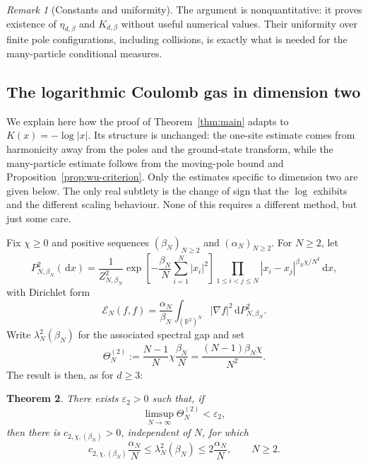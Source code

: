 \documentclass[12pt,reqno,letterpaper]{amsart}
\newtheorem{theorem}{Theorem}[section]
\theoremstyle{definition}
\theoremstyle{remark}
\newtheorem{remark}[theorem]{Remark}
\numberwithin{equation}{section}
\newcommand{\R}{\mathbb R}
\newcommand{\dd}{\,\mathrm d}
\newcommand{\be}{\beta}
\newcommand{\al}{\alpha}
\newcommand{\cE}{\mathcal E}
\begin{document}
\begin{remark}[Constants and uniformity]
The argument is nonquantitative: it proves existence of
\(\eta_{d,\be}\) and \(K_{d,\be}\) without useful numerical values.
Their uniformity over finite pole configurations, including collisions, is
exactly what is needed for the many-particle conditional measures.
\end{remark}

\begin{appendix}
    
\section{The logarithmic Coulomb gas in dimension two}
\label{app:planar-log}

We explain here how the proof of Theorem~\ref{thm:main} adapts to
\(K(x)=-\log|x|\).  Its structure is unchanged: the one-site estimate comes
from harmonicity away from the poles and the ground-state transform, while
the many-particle estimate follows from the moving-pole bound and
Proposition~\ref{prop:wu-criterion}.  Only the estimates specific to dimension
two are given below. The only real subtlety is the change of sign that the $\log$ exhibits and the different scaling behaviour. None of this requires a different method, but just some care.

Fix \(\chi\ge0\) and positive sequences \((\be_N)_{N\ge2}\) and
\((\al_N)_{N\ge2}\).  For \(N\ge2\), let
\begin{equation}\label{eq:planar-law}
 P_{N,\be_N}^{2}(\dd x)
 =\frac1{Z_{N,\be_N}^{2}}
 \exp\!\left[-\frac{\be_N}{N}\sum_{i=1}^N|x_i|^2\right]
 \prod_{1\le i<j\le N}|x_i-x_j|^{\be_N\chi/N^2}\dd x,
\end{equation}
with Dirichlet form
\[
 \cE_N(f,f)=\frac{\al_N}{\be_N}
 \int_{(\R^2)^N}|\nabla f|^2\dd P_{N,\be_N}^{2}.
\]
Write \(\lambda_N^2(\be_N)\) for the associated spectral gap and set
\begin{equation}\label{eq:planar-theta}
 \Theta_N^{(2)}
 :=\frac{N-1}{N}\chi\frac{\be_N}{N}
 =\frac{(N-1)\be_N\chi}{N^2}.
\end{equation}
The result is then, as for $d\ge 3:$

\begin{theorem}\label{thm:planar-log}
There exists \(\varepsilon_2>0\) such that, if
\[
 \limsup_{N\to\infty}\Theta_N^{(2)}<\varepsilon_2,
\]
then there is \(c_{2,\chi,(\be_N)}>0\), independent of \(N\), for which
\begin{equation}\label{eq:planar-gap}
 c_{2,\chi,(\be_N)}\frac{\al_N}{N}
 \le \lambda_N^2(\be_N)
 \le 2\frac{\al_N}{N},
 \qquad N\ge2.
\end{equation}
\end{theorem}


\end{appendix}
\end{document}
